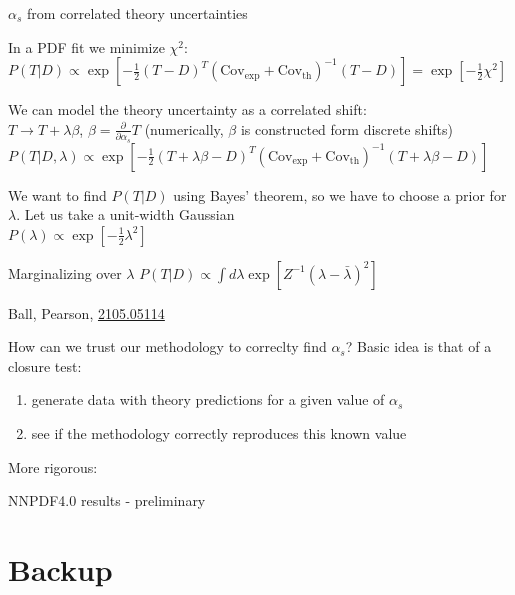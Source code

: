 \documentclass[8pt,t]{beamer}
\begin{document}
\begin{frame}{$\alpha_s$ from correlated theory uncertainties}

  In a PDF fit we minimize $\chi^2$:\\
  $P(T|D) \propto \exp\left[-\frac{1}{2}\left(T-D\right)^T\left(\mathrm{Cov}_\mathrm{exp}+\mathrm{Cov}_\mathrm{th}\right)^{-1}\left(T-D\right)\right]
  = \exp\left[-\frac{1}{2}\chi^2\right]$

  \vspace*{1em}
  We can model the theory uncertainty as a correlated shift: \\
  $T \rightarrow T + \lambda \beta $, \quad $\beta=\frac{\partial}{\partial \alpha_s}T$ (numerically, $\beta$ is constructed form discrete shifts)\\
  $P(T|D,\lambda) \propto \exp\left[-\frac{1}{2}\left(T+\lambda\beta-D\right)^T\left(\mathrm{Cov}_\mathrm{exp}+\mathrm{Cov}_\mathrm{th}\right)^{-1}\left(T+\lambda\beta-D\right)\right]$

  \vspace*{1em}
  We want to find $P(T|D)$ using Bayes' theorem, so we have to choose a prior for $\lambda$. Let us take a unit-width Gaussian\\
  $P(\lambda) \propto \exp\left[-\frac{1}{2}\lambda^2\right]$

  \vspace*{1em}
  Marginalizing over $\lambda$
  $P(T|D) \propto \int d\lambda \exp\left[Z^{-1}\left(\lambda-\bar{\lambda}\right)^2\right] $


  \vfill
  {\color{gray} \footnotesize Ball, Pearson, \hyperlink{https://arxiv.org/abs/2105.05114}{2105.05114}}
\end{frame}


\begin{frame}{How can we trust our methodology to correclty find $\alpha_s$?}
  Basic idea is that of a closure test:
  \begin{enumerate}
    \item generate data with theory predictions for a given value of $\alpha_s$
    \item see if the methodology correctly reproduces this known value
  \end{enumerate}

  More rigorous:
\end{frame}


\begin{frame}{NNPDF4.0 results - preliminary}
\end{frame}



\appendix
\section{Backup}


\end{document}
